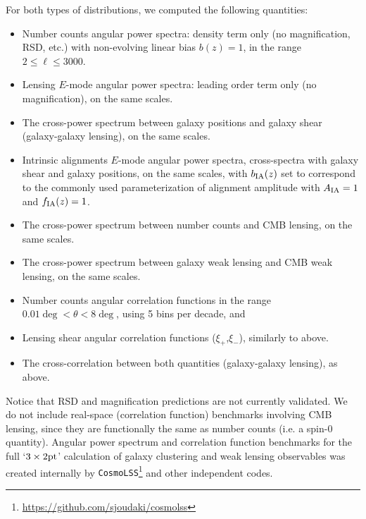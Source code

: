 \documentclass[\docopts]{\docclass}
\begin{document}
For both types of distributions, we computed the following quantities:
\begin{itemize}
\item Number counts angular power spectra: density term only (no magnification, RSD, etc.) with non-evolving linear bias $b(z) = 1$, in the range $2 \leq \ell \leq 3000$.
\item Lensing $E$-mode angular power spectra: leading order term only (no magnification), on the same scales.
\item The cross-power spectrum between galaxy positions and galaxy shear (galaxy-galaxy lensing), on the same scales.
\item Intrinsic alignments $E$-mode angular power spectra, cross-spectra with galaxy shear and galaxy positions, on the same scales, with $b_{\rm IA}(z)$ set to correspond to the commonly used parameterization of alignment amplitude \citep[e.g.][]{Joudaki18} with $A_{\rm IA}=1$ and $f_{\rm IA}(z)=1$.
\item The cross-power spectrum between number counts and CMB lensing, on the same scales.
\item The cross-power spectrum between galaxy weak lensing and CMB weak lensing, on the same scales.
\item Number counts angular correlation functions in the range $0.01 \deg < \theta < 8 \deg$, using 5 bins per decade, and
\item Lensing shear angular correlation functions ($\xi_+$,$\xi_-$), similarly to above.
\item The cross-correlation between both quantities (galaxy-galaxy lensing), as above.
\end{itemize}
Notice that RSD and magnification predictions are not currently validated. We do not include real-space (correlation function) benchmarks involving CMB lensing, since they are functionally the same as number counts (i.e. a spin-0 quantity). Angular power spectrum and correlation function benchmarks for the full `$3 \times 2{\rm{pt}}$' calculation of galaxy clustering and weak lensing observables was created internally by {\tt CosmoLSS}\footnote{\url{https://github.com/sjoudaki/cosmolss}} and other independent codes.
\end{document}
